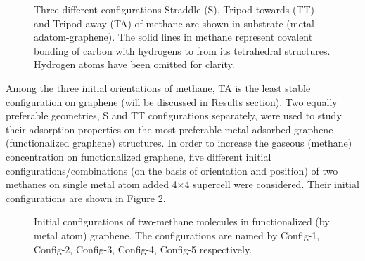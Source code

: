 \begin{figure}[h!]
\begin{center}
\end{center}
\caption[Three different configurations Straddle (S), Tripod-towards (TT) and Tripod-away (TA) of methane metal adatom-graphene.]{ Three different configurations Straddle (S), Tripod-towards (TT) and Tripod-away (TA) of methane are shown in substrate (metal adatom-graphene). The solid lines in methane represent covalent bonding of carbon with hydrogens to from its tetrahedral structures. Hydrogen atoms have been omitted for clarity.}
\label{methane_conf}
\end{figure}
Among the three initial orientations of methane, TA is the least stable configuration on graphene (will be discussed in Results section). Two equally preferable geometries, S and TT configurations separately, were used to study their adsorption properties on the most preferable metal adsorbed graphene (functionalized graphene) structures. In order to increase the gaseous (methane) concentration on functionalized graphene, five different initial configurations/combinations (on the basis of orientation and position) of two methanes on single metal atom added 4$\times$4 supercell were considered. Their initial configurations are shown in Figure \ref{config-12345}.
\begin{figure}[h!]
\begin{center}
\end{center}
\caption[Initial configurations of two-methane molecules in functionalized (by metal atom) graphene. ]{ Initial configurations of two-methane molecules in functionalized (by metal atom) graphene. The configurations are named by Config-1, Config-2, Config-3, Config-4, Config-5 respectively.
}
\label{config-12345} 
\end{figure}
